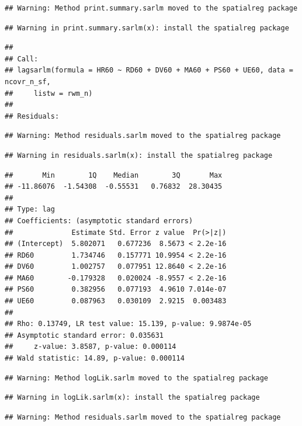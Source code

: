 \documentclass[]{book}
\begin{document}
\begin{verbatim}
## Warning: Method print.summary.sarlm moved to the spatialreg package
\end{verbatim}

\begin{verbatim}
## Warning in print.summary.sarlm(x): install the spatialreg package
\end{verbatim}

\begin{verbatim}
## 
## Call:
## lagsarlm(formula = HR60 ~ RD60 + DV60 + MA60 + PS60 + UE60, data = ncovr_n_sf, 
##     listw = rwm_n)
## 
## Residuals:
\end{verbatim}

\begin{verbatim}
## Warning: Method residuals.sarlm moved to the spatialreg package
\end{verbatim}

\begin{verbatim}
## Warning in residuals.sarlm(x): install the spatialreg package
\end{verbatim}

\begin{verbatim}
##       Min        1Q    Median        3Q       Max 
## -11.86076  -1.54308  -0.55531   0.76832  28.30435 
## 
## Type: lag 
## Coefficients: (asymptotic standard errors) 
##              Estimate Std. Error z value  Pr(>|z|)
## (Intercept)  5.802071   0.677236  8.5673 < 2.2e-16
## RD60         1.734746   0.157771 10.9954 < 2.2e-16
## DV60         1.002757   0.077951 12.8640 < 2.2e-16
## MA60        -0.179328   0.020024 -8.9557 < 2.2e-16
## PS60         0.382956   0.077193  4.9610 7.014e-07
## UE60         0.087963   0.030109  2.9215  0.003483
## 
## Rho: 0.13749, LR test value: 15.139, p-value: 9.9874e-05
## Asymptotic standard error: 0.035631
##     z-value: 3.8587, p-value: 0.000114
## Wald statistic: 14.89, p-value: 0.000114
\end{verbatim}

\begin{verbatim}
## Warning: Method logLik.sarlm moved to the spatialreg package
\end{verbatim}

\begin{verbatim}
## Warning in logLik.sarlm(x): install the spatialreg package
\end{verbatim}

\begin{verbatim}
## Warning: Method residuals.sarlm moved to the spatialreg package
\end{verbatim}
\end{document}
